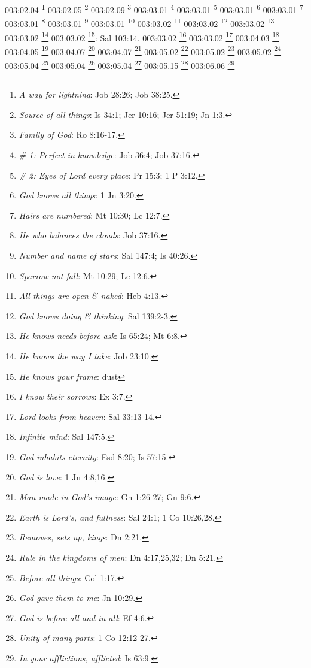 {{003:02.04 \footnote{\textit{A way for lightning}: Job 28:26; Job 38:25.}
003:02.05 \footnote{\textit{Source of all things}: Is 34:1; Jer 10:16; Jer 51:19; Jn 1:3.}
003:02.09 \footnote{\textit{Family of God}: Ro 8:16-17.}
003:03.01 \footnote{\textit{# 1: Perfect in knowledge}: Job 36:4; Job 37:16.}
003:03.01 \footnote{\textit{# 2: Eyes of Lord every place}: Pr 15:3; 1 P 3:12.}
003:03.01 \footnote{\textit{God knows all things}: 1 Jn 3:20.}
003:03.01 \footnote{\textit{Hairs are numbered}: Mt 10:30; Lc 12:7.}
003:03.01 \footnote{\textit{He who balances the clouds}: Job 37:16.}
003:03.01 \footnote{\textit{Number and name of stars}: Sal 147:4; Is 40:26.}
003:03.01 \footnote{\textit{Sparrow not fall}: Mt 10:29; Lc 12:6.}
003:03.02 \footnote{\textit{All things are open & naked}: Heb 4:13.}
003:03.02 \footnote{\textit{God knows doing & thinking}: Sal 139:2-3.}
003:03.02 \footnote{\textit{He knows needs before ask}: Is 65:24; Mt 6:8.}
003:03.02 \footnote{\textit{He knows the way I take}: Job 23:10.}
003:03.02 \footnote{\textit{He knows your frame}: dust}: Sal 103:14.}
003:03.02 \footnote{\textit{I know their sorrows}: Ex 3:7.}
003:03.02 \footnote{\textit{Lord looks from heaven}: Sal 33:13-14.}
003:04.03 \footnote{\textit{Infinite mind}: Sal 147:5.}
003:04.05 \footnote{\textit{God inhabits eternity}: Esd 8:20; Is 57:15.}
003:04.07 \footnote{\textit{God is love}: 1 Jn 4:8,16.}
003:04.07 \footnote{\textit{Man made in God's image}: Gn 1:26-27; Gn 9:6.}
003:05.02 \footnote{\textit{Earth is Lord's, and fullness}: Sal 24:1; 1 Co 10:26,28.}
003:05.02 \footnote{\textit{Removes, sets up, kings}: Dn 2:21.}
003:05.02 \footnote{\textit{Rule in the kingdoms of men}: Dn 4:17,25,32; Dn 5:21.}
003:05.04 \footnote{\textit{Before all things}: Col 1:17.}
003:05.04 \footnote{\textit{God gave them to me}: Jn 10:29.}
003:05.04 \footnote{\textit{God is before all and in all}: Ef 4:6.}
003:05.15 \footnote{\textit{Unity of many parts}: 1 Co 12:12-27.}
003:06.06 \footnote{\textit{In your afflictions, afflicted}: Is 63:9.}

}
